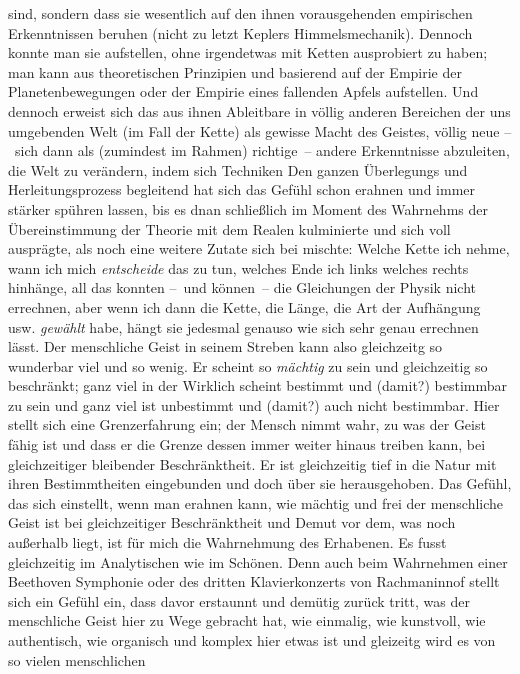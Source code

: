   sind, sondern dass sie wesentlich auf den ihnen vorausgehenden empirischen
  Erkenntnissen beruhen (nicht zu letzt Keplers Himmelsmechanik).
Dennoch konnte man sie aufstellen, ohne irgendetwas mit Ketten ausprobiert zu
  haben; man kann aus theoretischen Prinzipien und basierend auf der
  Empirie der Planetenbewegungen oder der Empirie eines fallenden Apfels
  aufstellen.
Und dennoch erweist sich das aus ihnen Ableitbare in völlig anderen Bereichen
  der uns umgebenden Welt (\zB im Fall der Kette) als gewisse Macht des
  Geistes, völlig neue --~sich dann als (zumindest im Rahmen) richtige~--
  andere Erkenntnisse abzuleiten, die Welt zu verändern, indem sich
  Techniken
Den ganzen Überlegungs und Herleitungsprozess begleitend hat sich das Gefühl
  schon erahnen und immer stärker spühren lassen, bis es dnan schließlich im
  Moment des Wahrnehms der Übereinstimmung der Theorie mit dem Realen
  kulminierte und sich voll ausprägte, als noch eine weitere Zutate sich bei
  mischte:
Welche Kette ich nehme, wann ich mich \emph{entscheide} das zu tun, welches
  Ende ich links welches rechts hinhänge, all das konnten --~und können~-- die
  Gleichungen der Physik nicht errechnen, aber wenn ich dann die Kette, die
  Länge, die Art der Aufhängung usw. \emph{gewählt} habe, hängt sie jedesmal
  genauso wie sich sehr genau errechnen lässt.
Der menschliche Geist in seinem Streben kann also gleichzeitg so wunderbar
  viel und so wenig.
Er scheint so \emph{mächtig} zu sein und gleichzeitig so beschränkt; ganz viel
  in der Wirklich scheint bestimmt und (damit?) bestimmbar zu sein und ganz
  viel ist unbestimmt und (damit?) auch nicht bestimmbar.
Hier stellt sich eine Grenzerfahrung ein; der Mensch nimmt wahr, zu was der
  Geist fähig ist und dass er die Grenze dessen immer weiter hinaus treiben
  kann, bei gleichzeitiger bleibender Beschränktheit.
Er ist gleichzeitig tief in die Natur mit ihren Bestimmtheiten eingebunden und
  doch über sie herausgehoben.
Das Gefühl, das sich einstellt, wenn man erahnen kann, wie mächtig und frei der
  menschliche Geist ist bei gleichzeitiger Beschränktheit und Demut vor dem,
  was noch außerhalb liegt, ist für mich die Wahrnehmung des Erhabenen.
Es fusst gleichzeitig im Analytischen wie im Schönen.
Denn auch beim Wahrnehmen einer Beethoven Symphonie oder \zB des dritten
  Klavierkonzerts von Rachmaninnof stellt sich ein Gefühl ein, dass davor
  erstaunnt und demütig zurück tritt, was der menschliche Geist hier zu Wege
  gebracht hat, wie einmalig, wie kunstvoll, wie authentisch, wie organisch
  und komplex hier etwas ist und gleizeitg wird es von so vielen menschlichen
